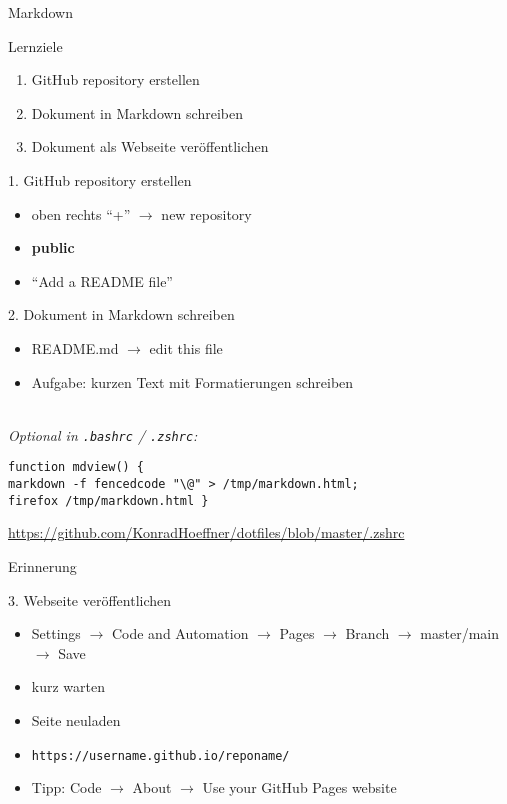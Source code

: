 \documentclass[14pt,aspectratio=1610]{beamer}
\begin{document}
\begin{frame}[fragile]{Markdown}
\small

\end{frame}

\begin{frame}{Lernziele}
\begin{enumerate}
\item GitHub repository erstellen
\item Dokument in Markdown schreiben
\item Dokument als Webseite veröffentlichen
\end{enumerate}
\end{frame}

\begin{frame}{1. GitHub repository erstellen}
\begin{itemize}
\item oben rechts \enquote{+} $\rightarrow$ new repository
\item \textbf{public}
\item \enquote{Add a README file}
\end{itemize}
\end{frame}

\begin{frame}[fragile]{2. Dokument in Markdown schreiben}
\begin{itemize}
\item README.md $\rightarrow$ edit this file
\item Aufgabe: kurzen Text mit Formatierungen schreiben
\end{itemize}

~\\
\emph{Optional in \texttt{.bashrc} / \texttt{.zshrc}:}\\
\begin{verbatim}
function mdview() {
markdown -f fencedcode "\@" > /tmp/markdown.html;
firefox /tmp/markdown.html }
\end{verbatim}

\url{https://github.com/KonradHoeffner/dotfiles/blob/master/.zshrc}
\end{frame}

\begin{frame}[fragile]{Erinnerung}
\small

\end{frame}

\begin{frame}{3. Webseite veröffentlichen}
\begin{itemize}
\item Settings $\rightarrow$ Code and Automation $\rightarrow$ Pages $\rightarrow$ Branch $\rightarrow$ master/main $\rightarrow$ Save
\item kurz warten
\item Seite neuladen
\item \texttt{https://username.github.io/reponame/}
\item Tipp: Code $\rightarrow$ About $\rightarrow$ Use your GitHub Pages website
\end{itemize}
\end{frame}
\end{document}
